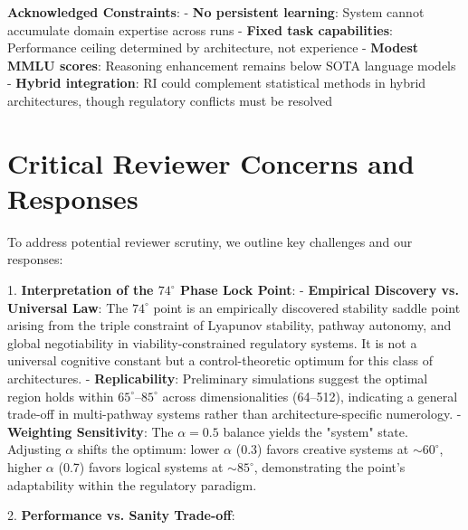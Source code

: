 \documentclass[12pt,a4paper]{report}
\begin{document}
\textbf{Acknowledged Constraints}:
- \textbf{No persistent learning}: System cannot accumulate domain expertise across runs
- \textbf{Fixed task capabilities}: Performance ceiling determined by architecture, not experience
- \textbf{Modest MMLU scores}: Reasoning enhancement remains below SOTA language models
- \textbf{Hybrid integration}: RI could complement statistical methods in hybrid architectures, though regulatory conflicts must be resolved

\section{Critical Reviewer Concerns and Responses}

To address potential reviewer scrutiny, we outline key challenges and our responses:

1. \textbf{Interpretation of the $74^\circ$ Phase Lock Point}:
   - \textbf{Empirical Discovery vs. Universal Law}: The $74^\circ$ point is an empirically discovered stability saddle point arising from the triple constraint of Lyapunov stability, pathway autonomy, and global negotiability in viability-constrained regulatory systems. It is not a universal cognitive constant but a control-theoretic optimum for this class of architectures.
   - \textbf{Replicability}: Preliminary simulations suggest the optimal region holds within $65^\circ$–$85^\circ$ across dimensionalities (64–512), indicating a general trade-off in multi-pathway systems rather than architecture-specific numerology.
   - \textbf{Weighting Sensitivity}: The $\alpha = 0.5$ balance yields the "system" state. Adjusting $\alpha$ shifts the optimum: lower $\alpha$ (0.3) favors creative systems at $\sim 60^\circ$, higher $\alpha$ (0.7) favors logical systems at $\sim 85^\circ$, demonstrating the point's adaptability within the regulatory paradigm.

2. \textbf{Performance vs. Sanity Trade-off}:
   
\end{document}
